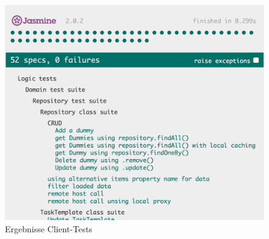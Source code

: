 			\begin{figure}[H]
				\includegraphics[width=0.8\linewidth]{projectPlan/media/img/clientTestResult.png}
				\centering
				\caption{Ergebnisse Client-Tests}
				\label{fig:clientTestResult}
			\end{figure}

